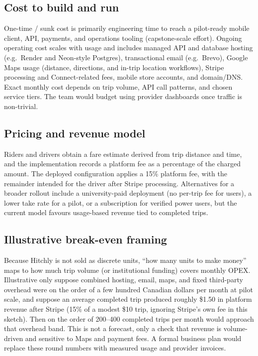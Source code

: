 \documentclass{article}
\begin{document}
\subsection{Cost to build and run}

\noindent One-time / sunk cost is primarily engineering time to reach a pilot-ready mobile client, API, payments, and operations tooling (capstone-scale effort). Ongoing operating cost scales with usage and includes managed API and database hosting (e.g.\ Render and Neon-style Postgres), transactional email (e.g.\ Brevo), Google Maps usage (distance, directions, and in-trip location workflows), Stripe processing and Connect-related fees, mobile store accounts, and domain/DNS. Exact monthly cost depends on trip volume, API call patterns, and chosen service tiers. The team would budget using provider dashboards once traffic is non-trivial.

\subsection{Pricing and revenue model}

\noindent Riders and drivers obtain a fare estimate derived from trip distance and time, and the implementation records a platform fee as a percentage of the charged amount. The deployed configuration applies a 15\% platform fee, with the remainder intended for the driver after Stripe processing. Alternatives for a broader rollout include a university-paid deployment (no per-trip fee for users), a lower take rate for a pilot, or a subscription for verified power users, but the current model favours usage-based revenue tied to completed trips.

\subsection{Illustrative break-even framing}

\noindent Because Hitchly is not sold as discrete units, ``how many units to make money'' maps to how much trip volume (or institutional funding) covers monthly OPEX. Illustrative only suppose combined hosting, email, maps, and fixed third-party overhead were on the order of a few hundred Canadian dollars per month at pilot scale, and suppose an average completed trip produced roughly \$1.50 in platform revenue after Stripe (15\% of a modest \$10 trip, ignoring Stripe's own fee in this sketch). Then on the order of 200--400 completed trips per month would approach that overhead band. This is not a forecast, only a check that revenue is volume-driven and sensitive to Maps and payment fees. A formal business plan would replace these round numbers with measured usage and provider invoices.
\end{document}
